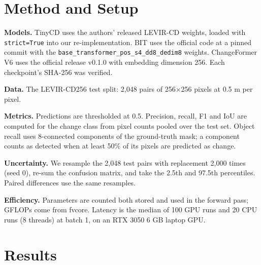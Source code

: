 \documentclass[conference]{IEEEtran}
\begin{document}
\section{Method and Setup}
\textbf{Models.} TinyCD uses the authors' released LEVIR-CD weights, loaded with \texttt{strict=True} into our re-implementation. BIT uses the official code at a pinned commit with the \texttt{base\_transformer\_pos\_s4\_dd8\_dedim8} weights. ChangeFormer V6 uses the official release v0.1.0 with embedding dimension 256. Each checkpoint's SHA-256 was verified.

\textbf{Data.} The LEVIR-CD256 test split: 2,048 pairs of 256$\times$256 pixels at 0.5 m per pixel.

\textbf{Metrics.} Predictions are thresholded at 0.5. Precision, recall, F1 and IoU are computed for the change class from pixel counts pooled over the test set. Object recall uses 8-connected components of the ground-truth mask; a component counts as detected when at least 50\% of its pixels are predicted as change.

\textbf{Uncertainty.} We resample the 2,048 test pairs with replacement 2,000 times (seed 0), re-sum the confusion matrix, and take the 2.5th and 97.5th percentiles. Paired differences use the same resamples.

\textbf{Efficiency.} Parameters are counted both stored and used in the forward pass; GFLOPs come from fvcore. Latency is the median of 100 GPU runs and 20 CPU runs (8 threads) at batch 1, on an RTX 3050 6 GB laptop GPU.

\section{Results}
\begin{table}[t]
\centering
\caption{LEVIR-CD test, 2,048 pairs, threshold 0.5. Paper F1 is from Codegoni et al.'s LEVIR-CD comparison table. CI is the 95\% bootstrap interval for F1. Values in \%.}
\label{tab:bench}
\small
{}
\end{table}
\end{document}
